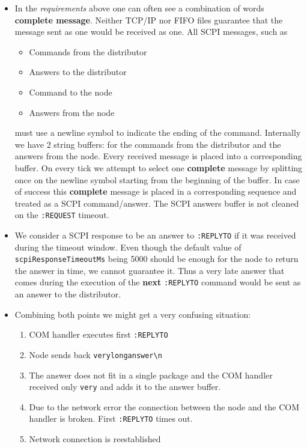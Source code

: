 \begin{itemize}
	\item{
		In the \textit{requirements} above one can often see a combination of words \textbf{complete message}. Neither TCP/IP nor FIFO files guarantee that the message sent as one would be received as one. All SCPI messages, such as
		\begin{itemize}
			\item Commands from the distributor
			\item Answers to the distributor
			\item Command to the node
			\item Answers from the node
		\end{itemize}
		must use a newline  symbol to indicate the ending of the command. Internally we have 2 string buffers: for the commands from the distributor and the answers from the node. Every received message is placed into a corresponding buffer. On every tick we attempt to select one \textbf{complete} message by splitting once on the newline symbol  starting from the beginning of the buffer. In case of success this \textbf{complete} message is placed in a corresponding sequence and treated as a SCPI command/answer. The SCPI answers buffer is not cleaned on the \texttt{:REQUEST} timeout.
	}
	\item We consider a SCPI response to be an answer to \texttt{:REPLYTO} if it was received during the timeout window. Even though the default value of \texttt{scpiResponseTimeoutMs} being 5000 should be enough for the node to return the answer in time, we cannot guarantee it. Thus a very late answer that comes during the execution of the \textbf{next} \texttt{:REPLYTO} command would be sent as an answer to the distributor.
	\item{
		Combining both points we might get a very confusing situation:
		\begin{enumerate}
			\item COM handler executes first \texttt{:REPLYTO}
			\item Node sends back \texttt{verylonganswer\textbackslash n}
			\item The answer does not fit in a single package and the COM handler received only \texttt{very} and adds it to the answer buffer.
			\item Due to the network error the connection between the node and the COM handler is broken. First \texttt{:REPLYTO} times out.
			\item Network connection is reestablished

\end{enumerate}}
\end{itemize}
